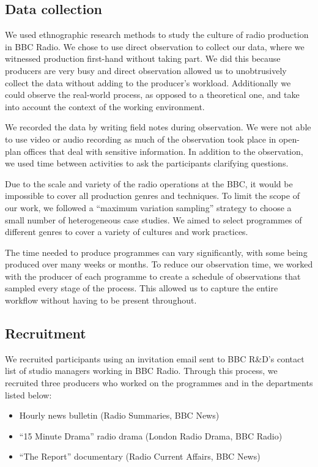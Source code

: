 \subsection{Data collection}
We used ethnographic research methods to study the culture of radio production in BBC Radio. We chose to use direct
observation to collect our data, where we witnessed production first-hand without taking part.  We did this because
producers are very busy and direct observation allowed us to unobtrusively collect the data without adding to the
producer's workload. Additionally we could observe the real-world process, as opposed to a theoretical one, and take
into account the context of the working environment.

We recorded the data by writing field notes during observation. We were not able to use video or audio recording as
much of the observation took place in open-plan offices that deal with sensitive information. In addition to the
observation, we used time between activities to ask the participants clarifying questions.

Due to the scale and variety of the radio operations at the BBC, it would be impossible to cover all production genres
and techniques. To limit the scope of our work, we followed a ``maximum variation sampling'' strategy \citep[p.
172]{Patton1990} to choose a small number of heterogeneous case studies. We aimed to select programmes of different
genres to cover a variety of cultures and work practices.

The time needed to produce programmes can vary significantly, with some being produced over many weeks or months. To
reduce our observation time, we worked with the producer of each programme to create a schedule of observations that
sampled every stage of the process. This allowed us to capture the entire workflow without having to be present
throughout.

\subsection{Recruitment}
We recruited participants using an invitation email sent to BBC R\&D's contact list of studio managers working in BBC
Radio. Through this process, we recruited three producers who worked on the programmes and in the departments listed
below:
\begin{itemize}
	\item Hourly news bulletin (Radio Summaries, BBC News)
	\item ``15 Minute Drama'' radio drama (London Radio Drama, BBC Radio)
	\item ``The Report'' documentary (Radio Current Affairs, BBC News)
\end{itemize}

